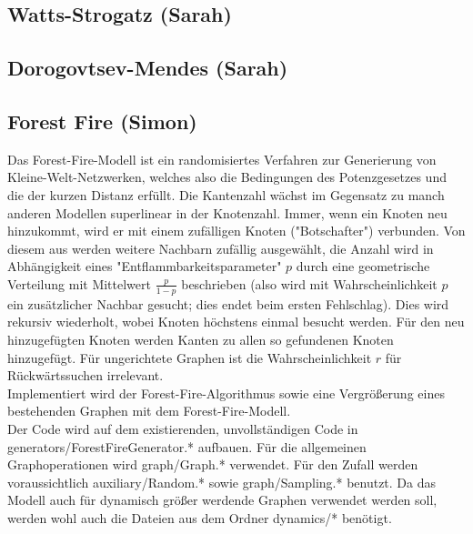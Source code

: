 \documentclass{scrartcl}
\begin{document}
\subsection{Watts-Strogatz (Sarah)}

\subsection{Dorogovtsev-Mendes (Sarah)}


\subsection{Forest Fire (Simon)}
Das Forest-Fire-Modell ist ein randomisiertes Verfahren zur Generierung von Kleine-Welt-Netzwerken, welches also die Bedingungen des Potenzgesetzes und die der kurzen Distanz erfüllt. Die Kantenzahl wächst im Gegensatz zu manch anderen Modellen superlinear in der Knotenzahl. Immer, wenn ein Knoten neu hinzukommt, wird er mit einem zufälligen Knoten ("Botschafter") verbunden. Von diesem aus werden weitere Nachbarn zufällig ausgewählt, die Anzahl wird in Abhängigkeit eines "Entflammbarkeitsparameter" $p$ durch eine geometrische Verteilung mit Mittelwert $\frac{p}{1-p}$ beschrieben (also wird mit Wahrscheinlichkeit $p$ ein zusätzlicher Nachbar gesucht; dies endet beim ersten Fehlschlag). Dies wird rekursiv wiederholt, wobei Knoten höchstens einmal besucht werden. Für den neu hinzugefügten Knoten werden Kanten zu allen so gefundenen Knoten hinzugefügt. Für ungerichtete Graphen ist die Wahrscheinlichkeit $r$ für Rückwärtssuchen irrelevant.\\
Implementiert wird der Forest-Fire-Algorithmus sowie eine Vergrößerung eines bestehenden Graphen mit dem Forest-Fire-Modell.\\
Der Code wird auf dem existierenden, unvollständigen Code in generators/ForestFireGenerator.* aufbauen. Für die allgemeinen Graphoperationen wird graph/Graph.* verwendet. Für den Zufall werden voraussichtlich auxiliary/Random.* sowie graph/Sampling.* benutzt. Da das Modell auch für dynamisch größer werdende Graphen verwendet werden soll, werden wohl auch die Dateien aus dem Ordner dynamics/* benötigt.
\end{document}
